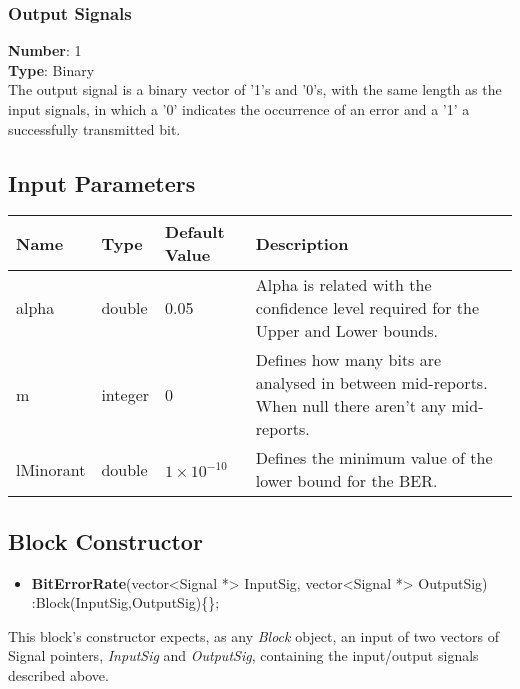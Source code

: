 \begin{refsection}
\begin{subs}
\subsubsection*{Output Signals}
\end{subs}
\hspace*{0.5in}\textbf{Number}: 1\\
\hspace*{0.5in}\textbf{Type}: Binary
\\
The output signal is a binary vector of '1's and '0's, with the same length as the input signals, in which a '0' indicates the occurrence of an error and a '1' a successfully transmitted bit.


\subsection*{Input Parameters}

\begin{table}[H]
\centering
\begin{tabular}{|p{1.5cm}|p{1.5cm}|p{1.5cm}|p{7cm}|}
\hline
\textbf{Name}   & \textbf{Type} & \textbf{Default Value}    & \textbf{Description} \\ \hline
alpha           & double        & 0.05                      & Alpha is related with the confidence level required for the Upper and Lower bounds. \\ \hline
m               & integer       & 0                         & Defines how many bits are analysed in between mid-reports. When null there aren't any mid-reports. \\ \hline
lMinorant       & double        & $1\times10^{-10}$         & Defines the minimum value of the lower bound for the BER.\\ \hline
\end{tabular}
\end{table}


\subsection*{Block Constructor}

\begin{itemize}
  \item \textbf{BitErrorRate}(vector<Signal *> InputSig, vector<Signal *> OutputSig) :Block(InputSig,OutputSig)\{\};
\end{itemize}
This block's constructor expects, as any \textit{Block} object, an input of two vectors of Signal pointers, \textit{InputSig} and \textit{OutputSig}, containing the input/output signals described above.


\end{refsection}
